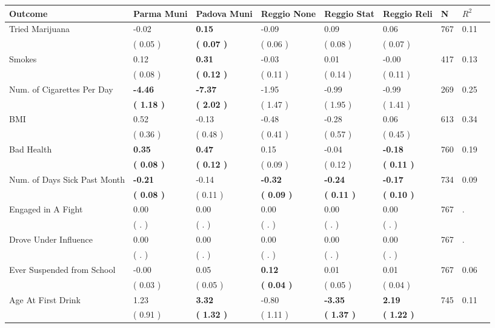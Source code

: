 \begin{tabular}{L{6.2cm} C{1.8cm} C{1.8cm} C{1.8cm} C{1.8cm} C{1.8cm} C{1.8cm} C{0.3cm} C{0.3cm}}
\toprule
 \textbf{Outcome} & \textbf{Parma Muni} & \textbf{Padova Muni} & \textbf{Reggio None} & \textbf{Reggio Stat} & \textbf{Reggio Reli} & \textbf{N} & \textbf{$ R^2$} \\
\midrule
Tried Marijuana &     -0.02 & \textbf{     0.15} &     -0.09 &      0.09 &      0.06  & 767 &       0.11 \\ 
 & (     0.05 ) & \textbf{(     0.07 )} & (     0.06 ) & (     0.08 ) & (     0.07 )  & \\
Smokes &      0.12 & \textbf{     0.31} &     -0.03 &      0.01 &     -0.00  & 417 &       0.13 \\ 
 & (     0.08 ) & \textbf{(     0.12 )} & (     0.11 ) & (     0.14 ) & (     0.11 )  & \\
Num. of Cigarettes Per Day & \textbf{    -4.46} & \textbf{    -7.37} &     -1.95 &     -0.99 &     -0.99  & 269 &       0.25 \\ 
 & \textbf{(     1.18 )} & \textbf{(     2.02 )} & (     1.47 ) & (     1.95 ) & (     1.41 )  & \\
BMI &      0.52 &     -0.13 &     -0.48 &     -0.28 &      0.06  & 613 &       0.34 \\ 
 & (     0.36 ) & (     0.48 ) & (     0.41 ) & (     0.57 ) & (     0.45 )  & \\
Bad Health & \textbf{     0.35} & \textbf{     0.47} &      0.15 &     -0.04 & \textbf{    -0.18}  & 760 &       0.19 \\ 
 & \textbf{(     0.08 )} & \textbf{(     0.12 )} & (     0.09 ) & (     0.12 ) & \textbf{(     0.11 )}  & \\
Num. of Days Sick Past Month & \textbf{    -0.21} &     -0.14 & \textbf{    -0.32} & \textbf{    -0.24} & \textbf{    -0.17}  & 734 &       0.09 \\ 
 & \textbf{(     0.08 )} & (     0.11 ) & \textbf{(     0.09 )} & \textbf{(     0.11 )} & \textbf{(     0.10 )}  & \\
Engaged in A Fight &      0.00 &      0.00 &      0.00 &      0.00 &      0.00  & 767 &          . \\ 
 & (        . ) & (        . ) & (        . ) & (        . ) & (        . )  & \\
Drove Under Influence &      0.00 &      0.00 &      0.00 &      0.00 &      0.00  & 767 &          . \\ 
 & (        . ) & (        . ) & (        . ) & (        . ) & (        . )  & \\
Ever Suspended from School &     -0.00 &      0.05 & \textbf{     0.12} &      0.01 &      0.01  & 767 &       0.06 \\ 
 & (     0.03 ) & (     0.05 ) & \textbf{(     0.04 )} & (     0.05 ) & (     0.04 )  & \\
Age At First Drink &      1.23 & \textbf{     3.32} &     -0.80 & \textbf{    -3.35} & \textbf{     2.19}  & 745 &       0.11 \\ 
 & (     0.91 ) & \textbf{(     1.32 )} & (     1.11 ) & \textbf{(     1.37 )} & \textbf{(     1.22 )}  & \\
\bottomrule
\end{tabular}
